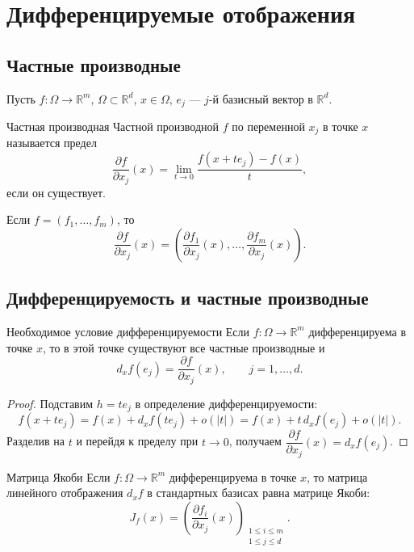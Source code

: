 
\section{Дифференцируемые отображения}

\subsection{Частные производные}

Пусть $f\colon\Omega \to \mathbb{R}^m$, $\Omega\subset\mathbb{R}^d$, $x \in \Omega$,
$e_j$ --- $j$-й базисный вектор в $\mathbb{R}^d$.

\begin{Definition}{Частная производная}{}
	Частной производной $f$ по переменной $x_j$ в точке $x$ называется предел
	\[
	\frac{\partial f}{\partial x_j}(x)
	=
	\lim_{t\to 0}
	\frac{f(x+te_j)-f(x)}{t},
	\]
	если он существует.
\end{Definition}

Если $f=(f_1,\dots,f_m)$, то
\[
\frac{\partial f}{\partial x_j}(x)
=
\left(
\frac{\partial f_1}{\partial x_j}(x),
\dots,
\frac{\partial f_m}{\partial x_j}(x)
\right).
\]

\subsection{Дифференцируемость и частные производные}

\begin{Statement}{Необходимое условие дифференцируемости}{}
	Если $f\colon\Omega \to \mathbb{R}^m$ дифференцируема в точке $x$, то в этой точке
	существуют все частные производные и
	\[
	d_xf(e_j)=\frac{\partial f}{\partial x_j}(x),
	\qquad j=1,\dots,d.
	\]
\end{Statement}

\begin{proof}
	Подставим $h = te_j$ в определение дифференцируемости:
	\[
	f(x+te_j)=f(x)+d_xf(te_j)+o(|t|)=f(x)+t\,d_xf(e_j)+o(|t|).
	\]
	Разделив на $t$ и перейдя к пределу при $t\to0$, получаем
	$\dfrac{\partial f}{\partial x_j}(x)=d_xf(e_j)$.
\end{proof}

\begin{Corollary}{Матрица Якоби}{}
	Если $f\colon\Omega \to \mathbb{R}^m$ дифференцируема в точке $x$, то матрица
	линейного отображения $d_xf$ в стандартных базисах равна матрице Якоби:
	\[
	J_f(x)=
	\left(
	\frac{\partial f_i}{\partial x_j}(x)
	\right)_{\substack{1\le i\le m\\1\le j\le d}}.
	\]
\end{Corollary}

